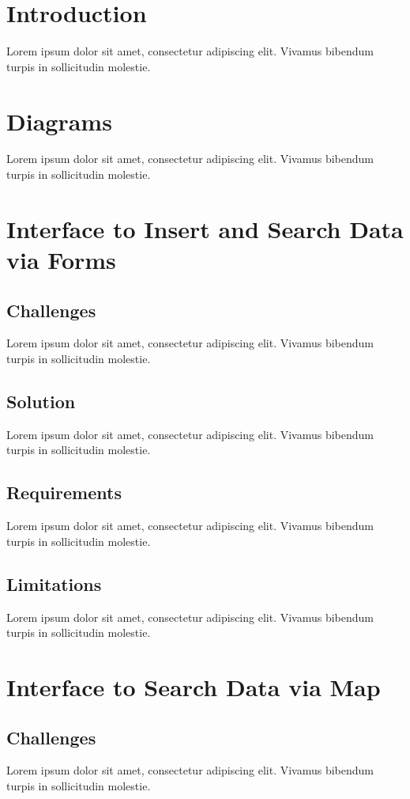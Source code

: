 \documentclass[11pt, a4paper]{article}
\begin{document}
\section{Introduction}
Lorem ipsum dolor sit amet, consectetur adipiscing elit. Vivamus bibendum turpis in sollicitudin
molestie.

\section{Diagrams}
Lorem ipsum dolor sit amet, consectetur adipiscing elit. Vivamus bibendum turpis in sollicitudin
molestie.

\section{Interface to Insert and Search Data via Forms}
\subsection{Challenges}
Lorem ipsum dolor sit amet, consectetur adipiscing elit. Vivamus bibendum turpis in sollicitudin
molestie.

\subsection{Solution}
Lorem ipsum dolor sit amet, consectetur adipiscing elit. Vivamus bibendum turpis in sollicitudin
molestie.

\subsection{Requirements}
Lorem ipsum dolor sit amet, consectetur adipiscing elit. Vivamus bibendum turpis in sollicitudin
molestie.

\subsection{Limitations}
Lorem ipsum dolor sit amet, consectetur adipiscing elit. Vivamus bibendum turpis in sollicitudin
molestie.

\section{Interface to Search Data via Map}
\subsection{Challenges}
Lorem ipsum dolor sit amet, consectetur adipiscing elit. Vivamus bibendum turpis in sollicitudin
molestie.
\end{document}

